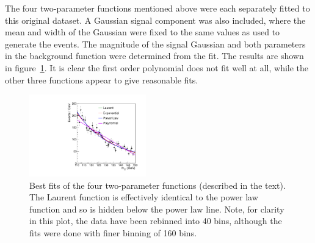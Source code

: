 The four two-parameter functions mentioned above were each 
separately fitted to this
original dataset. A Gaussian signal component was also included, where the
mean and width of the Gaussian were fixed to the same values as used to
generate the events.
The magnitude of the signal Gaussian and both parameters in the
background function were determined from the fit.
The results are shown in figure~\ref{fig:functions:bestfits}.
It is clear the first order polynomial does not fit well at all, while the 
other three functions appear to give reasonable fits.
%
\begin{figure}[tbp]
\centering
\includegraphics[width=0.45\textwidth]{functions/BestFits.pdf}
\caption{Best fits of the four two-parameter functions (described in the
text).
The Laurent function is effectively identical to the power law function
and so is hidden below the power law line. Note, for clarity in this plot, the
data have been rebinned into 40 bins, although the fits were done with
finer binning of 160 bins.}
\label{fig:functions:bestfits}
\end{figure}

